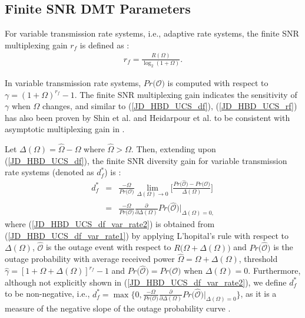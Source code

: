 \subsection{Finite SNR DMT Parameters}
For variable transmission rate systems, i.e., adaptive rate systems, the finite SNR multiplexing gain $r_f$ is defined as \cite[eq. (4)]{narasimhan2006finite}:
\begin{eqnarray} \label{JD_HBD_UCS_rf}
r_f = \frac{R(\Omega)}{\log_2(1+\Omega)}.
\end{eqnarray}

In variable transmission rate systems, $Pr\big(\mathcal{O}\big)$ is computed with respect to $\gamma=(1+\Omega)^{r_f}-1$. The finite SNR multiplexing gain indicates the sensitivity of $\gamma$ when $\Omega$ changes, and similar to (\ref{JD_HBD_UCS_df}), (\ref{JD_HBD_UCS_rf}) has also been proven by Shin et al. \cite{shin2008diversity} and Heidarpour et al. \cite{heidarpour2017finite} to be consistent with asymptotic multiplexing gain in \cite[eq. (3)]{zheng2003diversity}.

Let $\Delta(\Omega)=\widehat{\Omega}-\Omega$ where $\widehat{\Omega}>\Omega$. Then, extending upon (\ref{JD_HBD_UCS_df}), the finite SNR diversity gain for variable transmission rate systems (denoted as $d_{f}^{*}$) is \cite[eq. (36)]{shin2008diversity}:
\begin{eqnarray}
d_f^* & = & \frac{-\Omega}{Pr\big(\mathcal{O}\big)} \lim_{\Delta(\Omega)\to0} \Big[\frac{Pr\big(\mathcal{\widehat{O}}\big) - Pr\big(\mathcal{O}\big)}{\Delta(\Omega)}\Big] \label{JD_HBD_UCS_df_var_rate1} \\
& = & \frac{-\Omega}{Pr\big(\mathcal{O}\big)} \frac{\partial}{\partial\Delta(\Omega)} Pr\big(\mathcal{\widehat{O}}\big) \bigg|_{\Delta(\Omega)=0,} \label{JD_HBD_UCS_df_var_rate2}
\end{eqnarray}
where (\ref{JD_HBD_UCS_df_var_rate2}) is obtained from (\ref{JD_HBD_UCS_df_var_rate1}) by applying L'hopital's rule with respect to $\Delta(\Omega)$, $\mathcal{\widehat{O}}$ is the outage event with respect to $R\big(\Omega+\Delta(\Omega)\big)$ and $Pr\big(\mathcal{\widehat{O}}\big)$ is the outage probability with average received power $\widehat{\Omega}=\Omega+\Delta(\Omega)$, threshold $\widehat{\gamma}=[1+\Omega+\Delta(\Omega)]^{r_f}-1$ and $Pr\big(\mathcal{\widehat{O}}\big)=Pr\big(\mathcal{O}\big)$ when $\Delta(\Omega)=0$. Furthermore, although not explicitly shown in (\ref{JD_HBD_UCS_df_var_rate2}), we define $d_f^*$ to be non-negative, i.e., $d_f^* = \max\bigg\{0, \frac{-\Omega}{Pr\big(\mathcal{O}\big)} \frac{\partial}{\partial\Delta(\Omega)} Pr\big(\mathcal{\widehat{O}}\big) \bigg|_{\Delta(\Omega)=0} \bigg\}$, as it is a measure of the negative slope of the outage probability curve \cite{narasimhan2006finite}.

